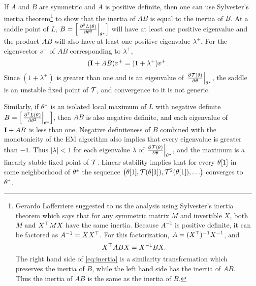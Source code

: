 If $A$ and $B$ are symmetric and $A$ is positive definite, then one
can  use Sylvester's inertia
theorem\footnote{Gerardo Lafferriere suggested to us the analysis using
  Sylvester's inertia theorem which says that for any symmetric matrix
  $M$ and invertible $X$, both $M$ and $X^\top M X$ have the same
  inertia.  Because $A^{-1}$ is positive definite, it can be factored
  as $A^{-1} = X X^\top$.  For this factorization, $A =
  (X^\top)^{-1}X^{-1}$, and
  \begin{equation}
    \label{eq:inertia}
    X^\top A B X = X^{-1} B X.
  \end{equation}
  The right hand side of \eqref{eq:inertia} is a similarity
  transformation which preserves the inertia of $B$, while the left
  hand side has the inertia of $AB$.  Thus the inertia of $AB$ is the
  same as the inertia of $B$.} to show that the inertia of $AB$ is
equal to the inertia of $B$. At a saddle point of $L$, $B= \left[
  \left. \frac{\partial^2 L(\theta)}{\partial
      \theta^2} \right|_{\theta^*} \right]$ will have at
least one positive eigenvalue and the product $AB$ will also have at
least one positive eigenvalue $\lambda^+$.  For the eigenvector $v^+$
of $AB$ corresponding to $\lambda^+$,
\begin{equation*}
  ({\bf I} +AB) v^+ = (1 + \lambda^+) v^+ .
\end{equation*}
Since $(1+\lambda^+)$ is greater than one and is an eigenvalue of
$\left. \frac{\partial \EMmap(\parameters)}{\partial \parameters}
\right|_{\parameters^*}$, the saddle is an unstable fixed point of
$\EMmap$, and convergence to it is not generic.

Similarly, if $\theta^*$ is an isolated local maximum of $L$ with
negative definite $B= \left[ \left.  \frac{\partial^2
      L(\theta)}{\partial \theta^2} \right|_{\theta^*}
\right]$, then $AB$ is also negative definite, and each eigenvalue of
${\bf I} + AB$ is less than one.  Negative definiteness of $B$ combined
with the monotonicity of the EM algorithm also implies that every
eigenvalue is greater than $-1$.  Thus $\left| \lambda \right| <1$ for
each eigenvalue $\lambda$ of $\left.  \frac{\partial
    \EMmap(\parameters)}{\partial \parameters}
\right|_{\parameters^*}$, and the maximum is a linearly stable fixed
point of $\EMmap$.  Linear stability implies that for every
${\theta}{[1]}$ in some neighborhood of $\theta^*$ the
sequence $\left( \ti{\parameters}{1}, \EMmap(\ti{\parameters}{1}),
  \EMmap^2(\ti{\parameters}{1}), \ldots \right)$ converges to
$\theta^*$.

